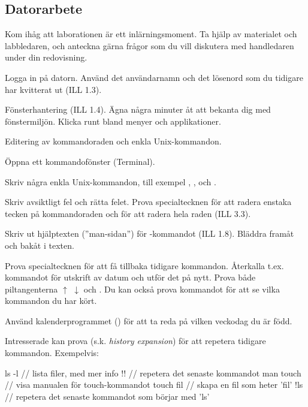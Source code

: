 \subsection*{Datorarbete}
Kom ihåg att laborationen är ett inlärningsmoment. Ta hjälp av materialet och labbledaren, och anteckna gärna frågor som du vill diskutera med handledaren under din redovisning.
\begin{Datorarbete}
	\item Logga in på datorn. Använd det användarnamn och det lösenord som du tidigare har kvitterat ut (ILL 1.3).
	\item Fönsterhantering (ILL 1.4). Ägna några minuter åt att bekanta dig med fönstermiljön. Klicka runt bland menyer och applikationer.
	\item Editering av kommandoraden och enkla Unix-kommandon.

	\begin{Deluppgifter}
		\item Öppna ett kommandofönster (Terminal).
		\item Skriv några enkla Unix-kommandon, till exempel , ,  och .
		\item Skriv avsiktligt fel och rätta felet. Prova specialtecknen för att radera enstaka tecken på kommandoraden och för att radera hela raden (ILL 3.3).
		\item Skriv ut hjälptexten (''man-sidan'') för -kommandot (ILL 1.8). Bläddra framåt och bakåt i texten.
		\item Prova specialtecknen för att få tillbaka tidigare kommandon. Återkalla t.ex. kommandot för utskrift av datum och utför det på nytt. Prova både piltangenterna $\uparrow$ $\downarrow$ och . Du kan också prova kommandot  för att se vilka kommandon du har kört.
		\item Använd kalenderprogrammet () för att ta reda på vilken veckodag du är född.
		\item Intresserade kan prova \code{!} (s.k. \emph{history expansion}) för att repetera tidigare kommandon. Exempelvis:
		\begin{Code}
			ls -l      // lista filer, med mer info
			!!         // repetera det senaste kommandot
			man touch  // visa manualen för touch-kommandot
			touch fil  // skapa en fil som heter 'fil'
			!ls        // repetera det senaste kommandot som börjar med 'ls'
		\end{Code}
	\end{Deluppgifter}


\end{Datorarbete}
